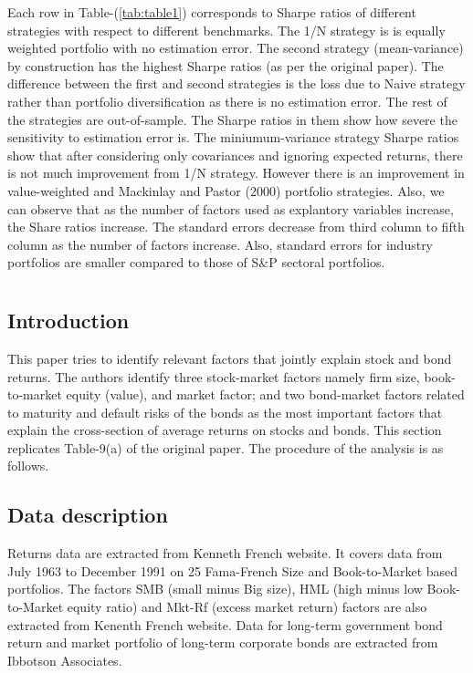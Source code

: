 \documentclass[11pt]{article}
\begin{document}
Each row in Table-(\ref{tab:table1}) corresponds to Sharpe ratios of different strategies with respect to different benchmarks. The 1/N strategy is is equally weighted portfolio with no estimation error. The second strategy (mean-variance) by construction has the highest Sharpe ratios (as per the original paper). The difference between the first and second strategies is the loss due to Naive strategy rather than portfolio diversification as there is no estimation error. The rest of the strategies are out-of-sample. The Sharpe ratios in them show how severe the sensitivity to estimation error is. The miniumum-variance strategy Sharpe ratios show that after considering only covariances and ignoring expected returns, there is not much improvement from 1/N strategy. However there is an improvement in value-weighted and Mackinlay and Pastor (2000) portfolio strategies. Also, we can observe that as the number of factors used as explantory variables increase, the Share ratios increase. The standard errors decrease from third column to fifth column as the number of factors increase. Also, standard errors for industry portfolios are smaller compared to those of S\&P sectoral portfolios.
\clearpage


\section{\cite{fama1992cross}} \label{sec:FF}

\subsection{Introduction}
 This paper tries to identify relevant factors that jointly explain stock and bond returns. The authors identify three stock-market factors namely firm size, book-to-market equity (value), and market factor; and two bond-market factors related to maturity and default risks of the bonds as the most important factors that explain the cross-section of average returns on stocks and bonds. This section replicates Table-9(a) of the original paper. The procedure of the analysis is as follows.

\subsection{Data description}
Returns data are extracted from Kenneth French website. It covers data from July 1963 to December 1991 on 25 Fama-French Size and Book-to-Market based
portfolios. The factors SMB (small minus Big size), HML (high minus low Book-to-Market equity ratio) and Mkt-Rf (excess market return) factors are
also extracted from Kenenth French website. Data for long-term government bond return and
market portfolio of long-term corporate bonds are extracted from Ibbotson Associates. 
\end{document}
